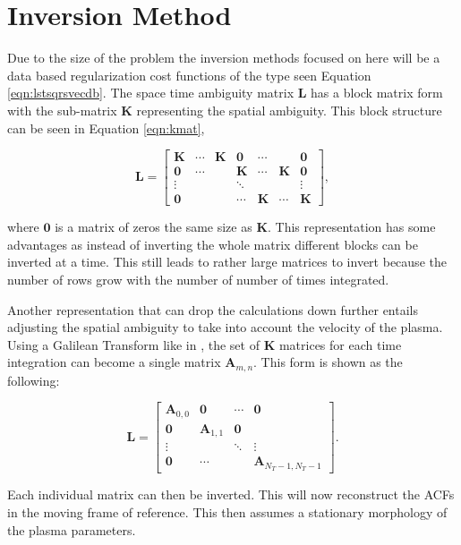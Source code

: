\section{Inversion Method}
\label{sec:isralg}
Due to the size of the problem the inversion methods focused on here will be a data based regularization cost functions of the type seen Equation \ref{eqn:lstsqrsvecdb}. The space time ambiguity matrix $\mathbf{L}$ has a block matrix form with the sub-matrix $\mathbf{K}$ representing the spatial ambiguity. This block structure can be seen in Equation \ref{eqn:kmat},

\begin{equation}
\label{eqn:kmat}
\mathbf{L}= \begin{bmatrix}\mathbf{K}&\cdots&\mathbf{K}&\mathbf{0}&\cdots&&\mathbf{0}\\
\mathbf{0}&\cdots&&\mathbf{K}&\cdots&\mathbf{K}&\mathbf{0}\\
\vdots&&&\ddots&&&\vdots\\
\mathbf{0}&&&\cdots&\mathbf{K}&\cdots&\mathbf{K}
\end{bmatrix},
\end{equation}

\noindent where $\mathbf{0}$ is a matrix of zeros the same size as $\mathbf{K}$. This representation has some advantages as instead of inverting the whole matrix different blocks can be inverted at a time. This still leads to rather large matrices to invert because the number of rows grow with the number of number of times integrated. 

Another representation that can drop the calculations down further entails adjusting the spatial ambiguity to take into account the velocity of the plasma. Using a Galilean Transform like in \citep{RDS:RDS20236}, the set of $\mathbf{K}$ matrices for each time integration can become a single matrix $\mathbf{A}_{m,n}$. This form is shown as the following:

\begin{equation}
\label{eqn:amat}
\mathbf{L}= \begin{bmatrix}
\mathbf{A}_{0,0}&\mathbf{0}&\cdots&\mathbf{0}\\
 \mathbf{0}&\mathbf{A}_{1,1}&\mathbf{0}&\\
 \vdots&&\ddots&\vdots\\
 \mathbf{0}&\cdots&&\mathbf{A}_{N_T-1,N_T-1}
\end{bmatrix}.
\end{equation}

\noindent Each individual matrix can then be inverted. This will now reconstruct the ACFs in the moving frame of reference. This then assumes a stationary morphology of the plasma parameters. 

